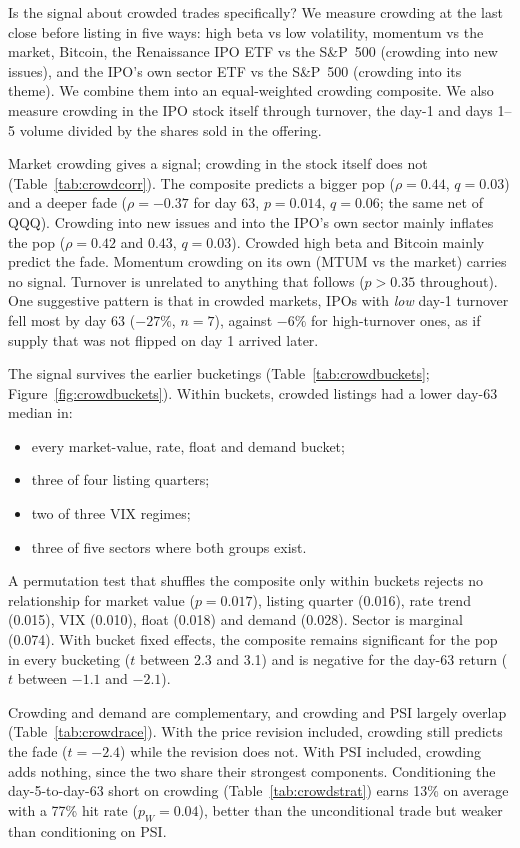 \documentclass[11pt]{article}
\begin{document}
Is the signal about crowded trades specifically? We measure crowding at the last close before listing in five ways: high beta vs low volatility, momentum vs the market, Bitcoin, the Renaissance IPO ETF vs the S\&P~500 (crowding into new issues), and the IPO's own sector ETF vs the S\&P~500 (crowding into its theme). We combine them into an equal-weighted crowding composite. We also measure crowding in the IPO stock itself through turnover, the day-1 and days 1--5 volume divided by the shares sold in the offering.

Market crowding gives a signal; crowding in the stock itself does not (Table~\ref{tab:crowdcorr}). The composite predicts a bigger pop ($\rho=0.44$, $q=0.03$) and a deeper fade ($\rho=-0.37$ for day 63, $p=0.014$, $q=0.06$; the same net of QQQ). Crowding into new issues and into the IPO's own sector mainly inflates the pop ($\rho=0.42$ and $0.43$, $q=0.03$). Crowded high beta and Bitcoin mainly predict the fade. Momentum crowding on its own (MTUM vs the market) carries no signal. Turnover is unrelated to anything that follows ($p>0.35$ throughout). One suggestive pattern is that in crowded markets, IPOs with \emph{low} day-1 turnover fell most by day 63 ($-27\%$, $n=7$), against $-6\%$ for high-turnover ones, as if supply that was not flipped on day 1 arrived later.

The signal survives the earlier bucketings (Table~\ref{tab:crowdbuckets}; Figure~\ref{fig:crowdbuckets}). Within buckets, crowded listings had a lower day-63 median in:
\begin{itemize}
\item every market-value, rate, float and demand bucket;
\item three of four listing quarters;
\item two of three VIX regimes;
\item three of five sectors where both groups exist.
\end{itemize}
A permutation test that shuffles the composite only within buckets rejects no relationship for market value ($p=0.017$), listing quarter (0.016), rate trend (0.015), VIX (0.010), float (0.018) and demand (0.028). Sector is marginal (0.074). With bucket fixed effects, the composite remains significant for the pop in every bucketing ($t$ between 2.3 and 3.1) and is negative for the day-63 return ($t$ between $-1.1$ and $-2.1$).

Crowding and demand are complementary, and crowding and PSI largely overlap (Table~\ref{tab:crowdrace}). With the price revision included, crowding still predicts the fade ($t=-2.4$) while the revision does not. With PSI included, crowding adds nothing, since the two share their strongest components. Conditioning the day-5-to-day-63 short on crowding (Table~\ref{tab:crowdstrat}) earns 13\% on average with a 77\% hit rate ($p_W=0.04$), better than the unconditional trade but weaker than conditioning on PSI.
\end{document}

